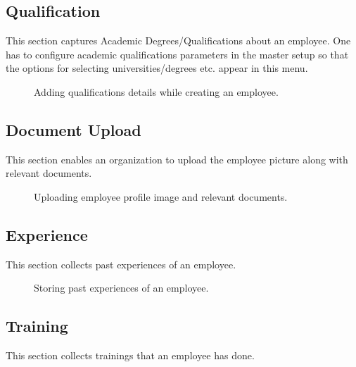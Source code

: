 \documentclass[letterpaper,10pt,english]{sphinxmanual}
\begin{document}
\subsection{Qualification}
\label{\detokenize{employee/add:qualification}}
This section captures Academic Degrees/Qualifications about an employee. One has to configure academic qualifications parameters in the master setup so that the options for selecting universities/degrees etc. appear in this menu.

\begin{figure}[htbp]
\centering
\capstart

\noindent{}
\caption{Adding qualifications details while creating an employee.}\label{\detokenize{employee/add:id9}}\end{figure}


\subsection{Document Upload}
\label{\detokenize{employee/add:document-upload}}
This section enables an organization to upload the employee picture along with relevant documents.

\begin{figure}[htbp]
\centering
\capstart

\noindent{}
\caption{Uploading employee profile image and relevant documents.}\label{\detokenize{employee/add:id10}}\end{figure}


\subsection{Experience}
\label{\detokenize{employee/add:experience}}
This section collects past experiences of an employee.

\begin{figure}[htbp]
\centering
\capstart

\noindent{}
\caption{Storing past experiences of an employee.}\label{\detokenize{employee/add:id11}}\end{figure}


\subsection{Training}
\label{\detokenize{employee/add:training}}
This section collects trainings that an employee has done.
\end{document}
